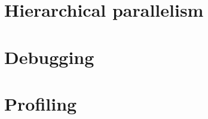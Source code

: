 \documentclass[a4paper,11pt]{article}
\begin{document}
\section{Hierarchical parallelism}

\section{Debugging}

\section{Profiling}
\end{document}
